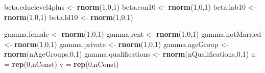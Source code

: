 \documentclass[12pt,twoside]{article}
\newenvironment{Shaded}{}{}
\newcommand{\KeywordTok}[1]{\textcolor[rgb]{0.00,0.44,0.13}{\textbf{{#1}}}}
\newcommand{\DecValTok}[1]{\textcolor[rgb]{0.25,0.63,0.44}{{#1}}}
\newcommand{\StringTok}[1]{\textcolor[rgb]{0.25,0.44,0.63}{{#1}}}
\newcommand{\NormalTok}[1]{{#1}}
\begin{document}
\begin{Shaded}
\begin{Highlighting}[]
            \NormalTok{beta.educlevel4plus  <-}\StringTok{ }\KeywordTok{rnorm}\NormalTok{(}\DecValTok{1}\NormalTok{,}\DecValTok{0}\NormalTok{,}\DecValTok{1}\NormalTok{)            }
            \NormalTok{beta.con10  <-}\StringTok{ }\KeywordTok{rnorm}\NormalTok{(}\DecValTok{1}\NormalTok{,}\DecValTok{0}\NormalTok{,}\DecValTok{1}\NormalTok{)            }
            \NormalTok{beta.lab10  <-}\StringTok{ }\KeywordTok{rnorm}\NormalTok{(}\DecValTok{1}\NormalTok{,}\DecValTok{0}\NormalTok{,}\DecValTok{1}\NormalTok{)            }
            \NormalTok{beta.ld10  <-}\StringTok{ }\KeywordTok{rnorm}\NormalTok{(}\DecValTok{1}\NormalTok{,}\DecValTok{0}\NormalTok{,}\DecValTok{1}\NormalTok{)            }

            \NormalTok{gamma.female <-}\StringTok{ }\KeywordTok{rnorm}\NormalTok{(}\DecValTok{1}\NormalTok{,}\DecValTok{0}\NormalTok{,}\DecValTok{1}\NormalTok{)}
            \NormalTok{gamma.rent <-}\StringTok{ }\KeywordTok{rnorm}\NormalTok{(}\DecValTok{1}\NormalTok{,}\DecValTok{0}\NormalTok{,}\DecValTok{1}\NormalTok{)}
            \NormalTok{gamma.notMarried <-}\StringTok{ }\KeywordTok{rnorm}\NormalTok{(}\DecValTok{1}\NormalTok{,}\DecValTok{0}\NormalTok{,}\DecValTok{1}\NormalTok{)}
            \NormalTok{gamma.private <-}\StringTok{ }\KeywordTok{rnorm}\NormalTok{(}\DecValTok{1}\NormalTok{,}\DecValTok{0}\NormalTok{,}\DecValTok{1}\NormalTok{)}
            \NormalTok{gamma.ageGroup <-}\StringTok{ }\KeywordTok{rnorm}\NormalTok{(nAgeGroups,}\DecValTok{0}\NormalTok{,}\DecValTok{1}\NormalTok{)}
            \NormalTok{gamma.qualifications <-}\StringTok{ }\KeywordTok{rnorm}\NormalTok{(nQualifications,}\DecValTok{0}\NormalTok{,}\DecValTok{1}\NormalTok{)}
            \NormalTok{u =}\StringTok{ }\KeywordTok{rep}\NormalTok{(}\DecValTok{0}\NormalTok{,nConst)}
            \NormalTok{v =}\StringTok{ }\KeywordTok{rep}\NormalTok{(}\DecValTok{0}\NormalTok{,nConst)}


\end{Highlighting}
\end{Shaded}
\end{document}
